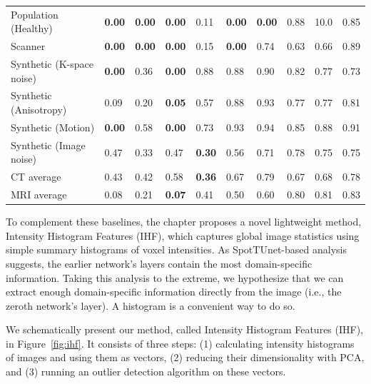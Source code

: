 \begin{table}[h]
{\begin{tabular}{llllllllll}
			Population (Healthy)      &  \textbf{0.00}  &  \textbf{0.00}  &  \textbf{0.00}  &            0.11 &  \textbf{0.00}  &  \textbf{0.00}  &  0.88 &     10.0 &  0.85 \\
			Scanner                   &  \textbf{0.00}  &  \textbf{0.00}  &  \textbf{0.00}  &            0.15 &  \textbf{0.00}  &            0.74 &  0.63 &     0.66 &  0.89 \\
			Synthetic (K-space noise) &  \textbf{0.00}  &            0.36 &  \textbf{0.00}  &            0.88 &            0.88 &            0.90 &  0.82 &     0.77 &  0.73 \\
			Synthetic (Anisotropy)    &            0.09 &            0.20 &  \textbf{0.05}  &            0.57 &            0.88 &            0.93 &  0.77 &     0.77 &  0.81 \\
			Synthetic (Motion)        &  \textbf{0.00}  &            0.58 &  \textbf{0.00}  &            0.73 &            0.93 &            0.94 &  0.85 &     0.88 &  0.91 \\
			Synthetic (Image noise)   &            0.47 &            0.33 &            0.47 &  \textbf{0.30}  &            0.56 &            0.71 &  0.78 &     0.75 &  0.75 \\
			\midrule
			CT average                &            0.43 &            0.42 &            0.58 &  \textbf{0.36}  &            0.67 &            0.79 &  0.67 &     0.68 &  0.78 \\
			MRI average               &            0.08 &            0.21 &  \textbf{0.07}  &            0.41 &            0.50 &            0.60 &  0.80 &     0.81 &  0.83 \\
			\bottomrule
	\end{tabular}}
	\label{tab:res_fpr}
\end{table}

To complement these baselines, the chapter proposes a novel lightweight method, Intensity Histogram Features (IHF), which captures global image statistics using simple summary histograms of voxel intensities. As SpotTUnet-based analysis suggests, the earlier network's layers contain the most domain-specific information. Taking this analysis to the extreme, we hypothesize that we can extract enough domain-specific information directly from the image (i.e., the zeroth network's layer). A histogram is a convenient way to do so.

We schematically present our method, called Intensity Histogram Features (IHF), in Figure~\ref{fig:ihf}. It consists of three steps: (1) calculating intensity histograms of images and using them as vectors, (2) reducing their dimensionality with PCA, and (3) running an outlier detection algorithm on these vectors.

